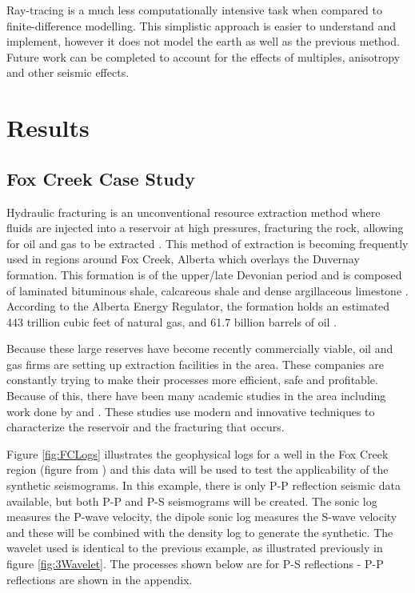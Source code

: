 \documentclass[12pt]{article}
\begin{document}
	Ray-tracing is a much less computationally intensive task when compared to finite-difference modelling. This simplistic approach is easier to understand and implement, however it does not model the earth as well as the previous method. Future work can be completed to account for the effects of multiples, anisotropy and other seismic effects. 
\FloatBarrier
\section{Results}
\subsection{Fox Creek Case Study}
	Hydraulic fracturing is an unconventional resource extraction method where fluids are injected into a reservoir at high pressures, fracturing the rock, allowing for oil and gas to be extracted \citep{eaton2018}. This method of extraction is becoming frequently used in regions around Fox Creek, Alberta which overlays the Duvernay formation. This formation is of the upper/late Devonian period and is composed of laminated bituminous shale, calcareous shale and dense argillaceous limestone \citep{campbell1968}. According to the Alberta Energy Regulator, the formation holds an estimated 443 trillion cubic feet of natural gas, and 61.7 billion barrels of oil \citep{Duvernay2016}.

	Because these large reserves have become recently commercially viable, oil and gas firms are setting up extraction facilities in the area. These companies are constantly trying to make their processes more efficient, safe and profitable. Because of this, there have been many academic studies in the area including work done by \cite{eaton2018} and \cite{german2018}. These studies use modern and innovative techniques to characterize the reservoir and the fracturing that occurs. 
	
	Figure \ref{fig:FCLogs} illustrates the geophysical logs for a well in the Fox Creek region (figure from \cite{german2018}) and this data will be used to test the applicability of the synthetic seismograms. In this example, there is only P-P reflection seismic data available, but both P-P and P-S seismograms will be created. The sonic log measures the P-wave velocity, the dipole sonic log measures the S-wave velocity and these will be combined with the density log to generate the synthetic. The wavelet used is identical to the previous example, as illustrated previously in figure \ref{fig:3Wavelet}. The processes shown below are for P-S reflections - P-P reflections are shown in the appendix. 
\end{document}
